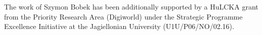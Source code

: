 \documentclass[
 twocolumn,
]{ceurart}
\begin{document}


\begin{acknowledgments}
The work of Szymon Bobek has been additionally supported by a HuLCKA grant from the Priority Research Area (Digiworld) under the Strategic Programme Excellence Initiative at the Jagiellonian University (U1U/P06/NO/02.16). 
\end{acknowledgments}


\end{document}
